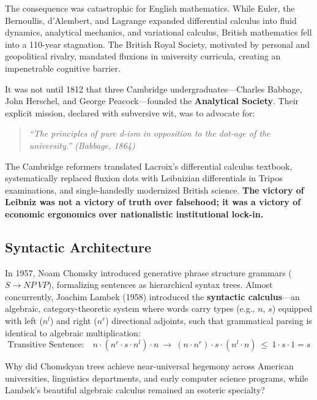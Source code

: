 \documentclass[11pt,letterpaper]{article}
\begin{document}
The consequence was catastrophic for English mathematics. While Euler, the Bernoullis, d'Alembert, and Lagrange expanded differential calculus into fluid dynamics, analytical mechanics, and variational calculus, British mathematics fell into a 110-year stagnation. The British Royal Society, motivated by personal and geopolitical rivalry, mandated fluxions in university curricula, creating an impenetrable cognitive barrier.

It was not until 1812 that three Cambridge undergraduates---Charles Babbage, John Herschel, and George Peacock---founded the \textbf{Analytical Society}. Their explicit mission, declared with subversive wit, was to advocate for:
\begin{quote}
\itshape
``The principles of pure d-ism in opposition to the dot-age of the university.'' (Babbage, 1864)
\end{quote}
The Cambridge reformers translated Lacroix's differential calculus textbook, systematically replaced fluxion dots with Leibnizian differentials in Tripos examinations, and single-handedly modernized British science. \textbf{The victory of Leibniz was not a victory of truth over falsehood; it was a victory of economic ergonomics over nationalistic institutional lock-in.}

\subsection{Syntactic Architecture}
In 1957, Noam Chomsky introduced generative phrase structure grammars ($S \to NP \ VP$), formalizing sentences as hierarchical syntax trees. Almost concurrently, Joachim Lambek (1958) introduced the \textbf{syntactic calculus}---an algebraic, category-theoretic system where words carry types (e.g., $n$, $s$) equipped with left ($n^l$) and right ($n^r$) directional adjoints, such that grammatical parsing is identical to algebraic multiplication:
\begin{equation}
\text{Transitive Sentence:} \quad n \cdot (n^r \cdot s \cdot n^l) \cdot n \ \longrightarrow \ (n \cdot n^r) \cdot s \cdot (n^l \cdot n) \ \le \ 1 \cdot s \cdot 1 = s
\end{equation}

Why did Chomskyan trees achieve near-universal hegemony across American universities, linguistics departments, and early computer science programs, while Lambek's beautiful algebraic calculus remained an esoteric specialty?
\end{document}
